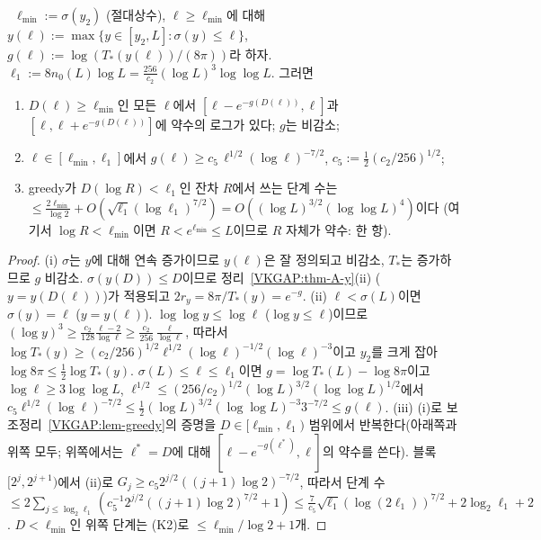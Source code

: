 \begin{lemma}\label{VKGAP:lem-smallzone}
\ $\ell_{\min}:=\sigma(y_2)$ (절대상수), $\ell\ge\ell_{\min}$에 대해 $y(\ell):=\max\{y\in[y_2,L]:\sigma(y)\le\ell\}$,
$g(\ell):=\log(T_*(y(\ell))/(8\pi))$라 하자. $\ell_1:=8n_0(L)\log L=\frac{256}{c_2}(\log L)^3\log\log L$. 그러면
\begin{enumerate}[label=(\roman*)]
\item $D(\ell)\ge\ell_{\min}$인 모든 $\ell$에서 $[\ell-e^{-g(D(\ell))},\ell]$과 $[\ell,\ell+e^{-g(D(\ell))}]$에 약수의 로그가 있다; $g$는 비감소;
\item $\ell\in[\ell_{\min},\ell_1]$에서 $g(\ell)\ge c_5\,\ell^{1/2}(\log\ell)^{-7/2}$, $c_5:=\frac12(c_2/256)^{1/2}$;
\item greedy가 $D(\log R)<\ell_1$인 잔차 $R$에서 쓰는 단계 수는 $\le\frac{2\ell_{\min}}{\log 2}+O(\sqrt{\ell_1}(\log\ell_1)^{7/2})=O((\log L)^{3/2}(\log\log L)^4)$이다
(여기서 $\log R<\ell_{\min}$이면 $R<e^{\ell_{\min}}\le L$이므로 $R$ 자체가 약수: 한 항).
\end{enumerate}
\end{lemma}
\begin{proof}
(i) $\sigma$는 $y$에 대해 연속 증가이므로 $y(\ell)$은 잘 정의되고 비감소, $T_*$는 증가하므로 $g$ 비감소.
$\sigma(y(D))\le D$이므로 정리~\ref{VKGAP:thm-A-y}(ii) ($y=y(D(\ell))$)가 적용되고 $2r_y=8\pi/T_*(y)=e^{-g}$.
(ii) $\ell<\sigma(L)$이면 $\sigma(y)=\ell$ ($y=y(\ell)$). $\log\log y\le\log\ell$ ($\log y\le\ell$)이므로
$(\log y)^3\ge\frac{c_2}{128}\frac{\ell-2}{\log\ell}\ge\frac{c_2}{256}\frac{\ell}{\log\ell}$, 따라서
$\log T_*(y)\ge(c_2/256)^{1/2}\ell^{1/2}(\log\ell)^{-1/2}(\log\ell)^{-3}$이고 $y_2$를 크게 잡아 $\log8\pi\le\frac12\log T_*(y)$.
$\sigma(L)\le\ell\le\ell_1$이면 $g=\log T_*(L)-\log8\pi$이고 $\log\ell\ge3\log\log L$, $\ell^{1/2}\le(256/c_2)^{1/2}(\log L)^{3/2}(\log\log L)^{1/2}$에서
$c_5\ell^{1/2}(\log\ell)^{-7/2}\le\frac12(\log L)^{3/2}(\log\log L)^{-3}3^{-7/2}\le g(\ell)$.
(iii) (i)로 보조정리~\ref{VKGAP:lem-greedy}의 증명을 $D\in[\ell_{\min},\ell_1)$ 범위에서 반복한다(아래쪽과 위쪽 모두; 위쪽에서는
$\ell^*=D$에 대해 $[\ell-e^{-g(\ell^*)},\ell]$의 약수를 쓴다). 블록 $[2^j,2^{j+1})$에서 (ii)로
$G_j\ge c_5 2^{j/2}((j+1)\log 2)^{-7/2}$, 따라서 단계 수 $\le2\sum_{j\le\log_2\ell_1}(c_5^{-1}2^{j/2}((j+1)\log2)^{7/2}+1)
\le\frac{7}{c_5}\sqrt{\ell_1}(\log(2\ell_1))^{7/2}+2\log_2\ell_1+2$.
$D<\ell_{\min}$인 위쪽 단계는 (K2)로 $\le\ell_{\min}/\log2+1$개.
\end{proof}

